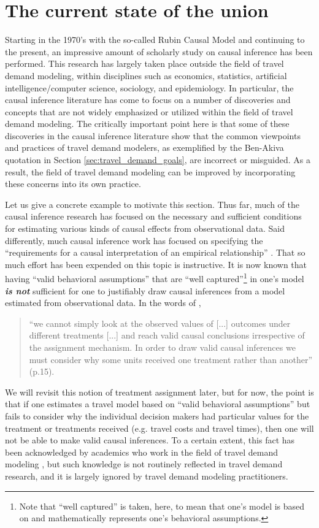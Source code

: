 \section{The current state of the union}
\label{sec:current_state_of_affairs}
Starting in the 1970's with the so-called Rubin Causal Model \citep{holland1986statistics} and continuing to the present, an impressive amount of scholarly study on causal inference has been performed. This research has largely taken place outside the field of travel demand modeling, within disciplines such as economics, statistics, artificial intelligence/computer science, sociology, and epidemiology. In particular, the causal inference literature has come to focus on a number of discoveries and concepts that are not widely emphasized or utilized within the field of travel demand modeling. The critically important point here is that some of these discoveries in the causal inference literature show that the common viewpoints and practices of travel demand modelers, as exemplified by the Ben-Akiva quotation in Section \ref{sec:travel_demand_goals}, are incorrect or misguided. As a result, the field of travel demand modeling can be improved by incorporating these concerns into its own practice.

Let us give a concrete example to motivate this section. Thus far, much of the causal inference research has focused on the necessary and sufficient conditions for estimating various kinds of causal effects from observational data. Said differently, much causal inference work has focused on specifying the ``requirements for a causal interpretation of an empirical relationship'' \citep{heckman2000causal}. That so much effort has been expended on this topic is instructive. It is now known that having ``valid behavioral assumptions'' that are ``well captured''\footnote{Note that ``well captured'' is taken, here, to mean that one's model is based on and mathematically represents one's behavioral assumptions.} in one's model \textbf{\textit{is not}} sufficient for one to justifiably draw causal inferences from a model estimated from observational data. In the words of \citet{imbens2015causal},
\begin{quotation}
``we cannot simply look at the observed values of [...] outcomes under different treatments [...] and reach valid causal conclusions irrespective of the assignment mechanism. In order to draw valid causal inferences we must consider why some units received one treatment rather than another'' (p.15).
\end{quotation}
We will revisit this notion of treatment assignment later, but for now, the point is that if one estimates a travel model based on ``valid behavioral assumptions'' but fails to consider why the individual decision makers had particular values for the treatment or treatments received (e.g. travel costs and travel times), then one will not be able to make valid causal inferences. To a certain extent, this fact has been acknowledged by academics who work in the field of travel demand modeling \citep{petrin2010control, mabit2010mode, pinjari2011modeling, guevara2015critical}, but such knowledge is not routinely reflected in travel demand research, and it is largely ignored by travel demand modeling practitioners.

